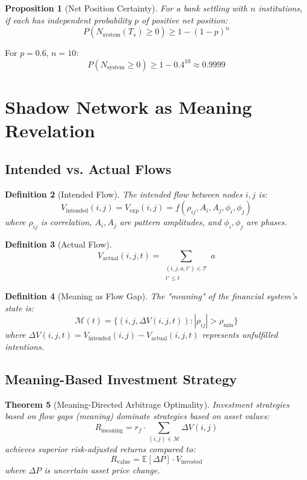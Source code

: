 \documentclass[12pt]{article}
\newtheorem{theorem}{Theorem}
\newtheorem{definition}[theorem]{Definition}
\newtheorem{proposition}[theorem]{Proposition}
\begin{document}
\begin{proposition}[Net Position Certainty]
For a bank settling with $n$ institutions, if each has independent probability $p$ of positive net position:
$$
P(N_{\text{system}}(T_s) \geq 0) \geq 1 - (1-p)^n
$$
\end{proposition}

For $p = 0.6$, $n = 10$:
$$
P(N_{\text{system}} \geq 0) \geq 1 - 0.4^{10} \approx 0.9999
$$

\section{Shadow Network as Meaning Revelation}

\subsection{Intended vs. Actual Flows}

\begin{definition}[Intended Flow]
The intended flow between nodes $i,j$ is:
$$
V_{\text{intended}}(i,j) = V_{\text{exp}}(i,j) = f(\rho_{ij}, A_i, A_j, \phi_i, \phi_j)
$$
where $\rho_{ij}$ is correlation, $A_i, A_j$ are pattern amplitudes, and $\phi_i, \phi_j$ are phases.
\end{definition}

\begin{definition}[Actual Flow]
$$
V_{\text{actual}}(i,j,t) = \sum_{\substack{(i,j,a,t') \in \mathcal{T} \\ t' \leq t}} a
$$
\end{definition}

\begin{definition}[Meaning as Flow Gap]
The "meaning" of the financial system's state is:
$$
\mathcal{M}(t) = \{(i,j,\Delta V(i,j,t)) : |\rho_{ij}| > \rho_{\min}\}
$$
where $\Delta V(i,j,t) = V_{\text{intended}}(i,j) - V_{\text{actual}}(i,j,t)$ represents unfulfilled intentions.
\end{definition}

\subsection{Meaning-Based Investment Strategy}

\begin{theorem}[Meaning-Directed Arbitrage Optimality]
Investment strategies based on flow gaps (meaning) dominate strategies based on asset values:
$$
R_{\text{meaning}} = r_f \cdot \sum_{(i,j) \in \mathcal{M}} \Delta V(i,j)
$$
achieves superior risk-adjusted returns compared to:
$$
R_{\text{value}} = \mathbb{E}[\Delta P] \cdot V_{\text{invested}}
$$
where $\Delta P$ is uncertain asset price change.
\end{theorem}
\end{document}
